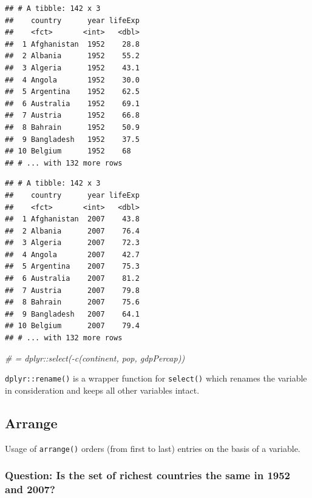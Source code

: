 \documentclass[11pt,]{article}
\newenvironment{Shaded}{\begin{snugshade}}{\end{snugshade}}
\newcommand{\KeywordTok}[1]{\textcolor[rgb]{0.13,0.29,0.53}{\textbf{#1}}}
\newcommand{\DecValTok}[1]{\textcolor[rgb]{0.00,0.00,0.81}{#1}}
\newcommand{\StringTok}[1]{\textcolor[rgb]{0.31,0.60,0.02}{#1}}
\newcommand{\CommentTok}[1]{\textcolor[rgb]{0.56,0.35,0.01}{\textit{#1}}}
\newcommand{\OperatorTok}[1]{\textcolor[rgb]{0.81,0.36,0.00}{\textbf{#1}}}
\newcommand{\NormalTok}[1]{#1}
\begin{document}
\begin{verbatim}
## # A tibble: 142 x 3
##    country      year lifeExp
##    <fct>       <int>   <dbl>
##  1 Afghanistan  1952    28.8
##  2 Albania      1952    55.2
##  3 Algeria      1952    43.1
##  4 Angola       1952    30.0
##  5 Argentina    1952    62.5
##  6 Australia    1952    69.1
##  7 Austria      1952    66.8
##  8 Bahrain      1952    50.9
##  9 Bangladesh   1952    37.5
## 10 Belgium      1952    68  
## # ... with 132 more rows
\end{verbatim}

\begin{Shaded}
\end{Shaded}

\begin{verbatim}
## # A tibble: 142 x 3
##    country      year lifeExp
##    <fct>       <int>   <dbl>
##  1 Afghanistan  2007    43.8
##  2 Albania      2007    76.4
##  3 Algeria      2007    72.3
##  4 Angola       2007    42.7
##  5 Argentina    2007    75.3
##  6 Australia    2007    81.2
##  7 Austria      2007    79.8
##  8 Bahrain      2007    75.6
##  9 Bangladesh   2007    64.1
## 10 Belgium      2007    79.4
## # ... with 132 more rows
\end{verbatim}

\begin{Shaded}
\begin{Highlighting}[]
\CommentTok{# = dplyr::select(-c(continent, pop, gdpPercap))}
\end{Highlighting}
\end{Shaded}

\texttt{dplyr::rename()} is a wrapper function for \texttt{select()}
which renames the variable in consideration and keeps all other
variables intact.

\subsection{Arrange}\label{arrange}

Usage of \texttt{arrange()} orders (from first to last) entries on the
basis of a variable.

\subsubsection{Question: Is the set of richest countries the same in
1952 and
2007?}\label{question-is-the-set-of-richest-countries-the-same-in-1952-and-2007}
\end{document}
